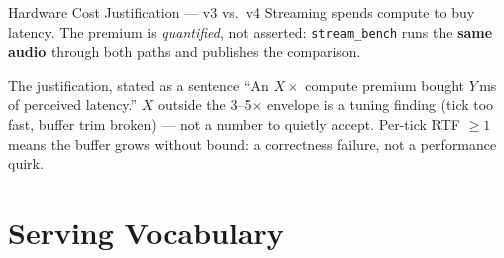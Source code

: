 \documentclass{beamer}
\begin{document}
\begin{frame}{Hardware Cost Justification --- v3 vs.\ v4}
    \small
    Streaming spends compute to buy latency. The premium is \emph{quantified},
    not asserted: \texttt{stream\_bench} runs the \textbf{same audio} through
    both paths and publishes the comparison.

    \vspace{0.3em}
    \begin{table}
    \centering\scriptsize
    \end{table}

    \vspace{0.3em}
    \begin{block}{\footnotesize The justification, stated as a sentence}
        \footnotesize
        ``An $X\times$ compute premium bought $Y$\,ms of perceived latency.''
        $X$ outside the 3--5$\times$ envelope is a tuning finding (tick too
        fast, buffer trim broken) --- not a number to quietly accept. Per-tick
        RTF $\geq 1$ means the buffer grows without bound: a correctness
        failure, not a performance quirk.
    \end{block}
\end{frame}


\section{Serving Vocabulary}
\end{document}
